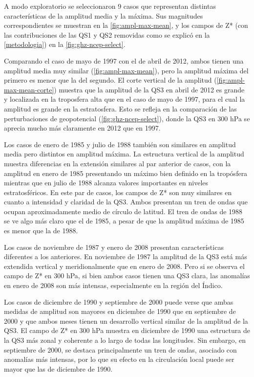 \documentclass[spanish,a4paper,12pt,oneside]{book}
\begin{document}
A modo exploratorio se seleccionaron 9 casos que representan distintas
características de la amplitud media y la máxima. Sus magnitudes
correspondientes se muestran en la \autoref{fig:ampl-max-mean}, y los
campos de Z* (con las contribuciones de las QS1 y QS2 removidas como se
explicó en la \autoref{metodologia}) en la
\autoref{fig:ghz-ncep-select}.

Comparando el caso de mayo de 1997 con el de abril de 2012, ambos tienen
una amplitud media muy similar (\autoref{fig:ampl-max-mean}), pero la
amplitud máxima del primero es menor que la del segundo. El corte
vertical de la amplitud (\autoref{fig:ampl-max-mean-corte}) muestra que
la amplitud de la QS3 en abril de 2012 es grande y localizada en la
troposfera alta que en el caso de mayo de 1997, para el cual la amplitud
es grande en la estratosfera. Esto se refleja en la comparación de las
perturbaciones de geopotencial (\autoref{fig:ghz-ncep-select}), donde la
QS3 en 300 hPa se aprecia mucho más claramente en 2012 que en 1997.

Los casos de enero de 1985 y julio de 1988 también son similares en
amplitud media pero distintos en amplitud máxima. La estructura vertical
de la amplitud muestra diferencias en la extensión similares al par
anterior de casos, con la amplitud en enero de 1985 presentando un
máximo bien definido en la tropósfera mientras que en julio de 1988
alcanza valores importantes en niveles estratosféricos. En este par de
casos, los campos de Z* son muy similares en cuanto a intensidad y
claridad de la QS3. Ambos presentan un tren de ondas que ocupan
aproximadamente medio de círculo de latitud. El tren de ondas de 1988 se
ve algo más claro que el de 1985, a pesar de que la amplitud máxima de
1985 es menor que la de 1988.

Los casos de noviembre de 1987 y enero de 2008 presentan características
diferentes a los anteriores. En noviembre de 1987 la amplitud de la QS3
está más extendida vertical y meridionalmente que en enero de 2008. Pero
si se observa el campo de Z* en 300 hPa, si bien ambos casos tienen una
QS3 clara, las anomalías en enero de 2008 son más intensas,
especialmente en la región del Índico.

Los casos de diciembre de 1990 y septiembre de 2000 puede verse que
ambas medidas de amplitud son mayores en diciembre de 1990 que en
septiembre de 2000 y que ambos meses tienen un desarrollo vertical
similar de la amplitud de la QS3. El campo de Z* en 300 hPa muestra en
diciembre de 1990 una estructura de la QS3 más zonal y coherente a lo
largo de todas las longitudes. Sin embargo, en septiembre de 2000, se
destaca principalmente un tren de ondas, asociado con anomalías más
intensas, por lo que su efecto en la circulación local puede ser mayor
que las de diciembre de 1990.
\end{document}

